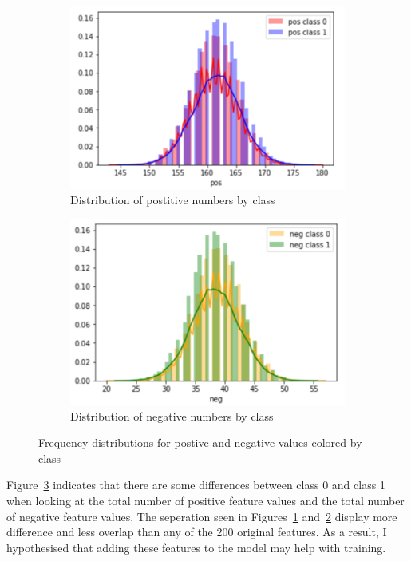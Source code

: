 \documentclass[11pt,letterpaper]{article}
\begin{document}
\begin{figure}[h!]
    \centering
    \begin{subfigure}[]{.4\textwidth}
        \includegraphics[width=\textwidth]{pos_dist.png}
        \caption{Distribution of postitive numbers by class}
        \label{fig:pos_dist}
    \end{subfigure}
    \begin{subfigure}[]{.4\textwidth}
        \includegraphics[width=\textwidth]{neg_dist.png}
        \caption{Distribution of negative numbers by class}
        \label{fig:neg_dist}
    \end{subfigure}
    \caption{Frequency distributions for postive and negative values colored by
class}
    \label{fig:count_dist}
\end{figure}

Figure~\ref{fig:count_dist} indicates that there are some differences
between class 0 and class 1 when looking at the total number of positive feature
values and the total number of negative feature values. The seperation seen in
Figures~\ref{fig:pos_dist} and~\ref{fig:neg_dist} display more difference and
less overlap than any of the 200 original features.  As a result, I
hypothesised that adding these features to the model may help with training. 
\end{document}
